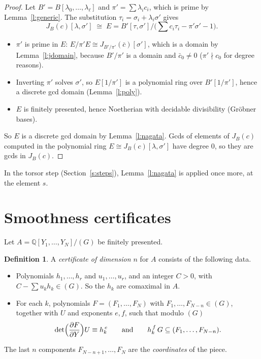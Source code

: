 \documentclass[11pt]{article}
\newcommand{\Q}{\mathbb{Q}}
\numberwithin{equation}{section}
\theoremstyle{plain}
\theoremstyle{definition}
\newtheorem{definition}[theorem]{Definition}
\theoremstyle{remark}
\begin{document}
\begin{proof}
Let $B'=B[\lambda_0,\dots,\lambda_\ell]$ and $\pi'=\sum\lambda_ic_i$, which is prime by
Lemma~\ref{l:generic}. The substitution $\tau_i=\sigma_i+\lambda_i\sigma'$ gives
\[
J_B(c)[\lambda,\sigma']\;\cong\;E=B'[\tau,\sigma']\Big/\Big(\sum c_i\tau_i-\pi'\sigma'-1\Big).
\]
\begin{itemize}
\item $\pi'$ is prime in $E$: $E/\pi'E\cong J_{B'/\pi'}(\bar c)[\sigma']$, which is a domain by
  Lemma~\ref{l:jdomain}, because $B'/\pi'$ is a domain and $\bar c_0\ne0$ ($\pi'\nmid c_0$ for
  degree reasons).
\item Inverting $\pi'$ solves $\sigma'$, so $E[1/\pi']$ is a polynomial ring over $B'[1/\pi']$, hence
  a discrete gcd domain (Lemma~\ref{l:poly}).
\item $E$ is finitely presented, hence Noetherian with decidable divisibility (Gröbner bases).
\end{itemize}
So $E$ is a discrete gcd domain by Lemma~\ref{l:nagata}. Gcds of elements of $J_B(c)$ computed in the
polynomial ring $E\cong J_B(c)[\lambda,\sigma']$ have degree $0$, so they are gcds in $J_B(c)$.
\end{proof}
In the torsor step (Section~\ref{s:steps}), Lemma~\ref{l:nagata} is applied once more, at the
element $s$.

\section{Smoothness certificates}\label{s:cert}

Let $A=\Q[Y_1,\dots,Y_N]/(G)$ be finitely presented.

\begin{definition}\label{d:cert}
A \emph{certificate of dimension $n$} for $A$ consists of the following data.
\begin{itemize}
\item Polynomials $h_1,\dots,h_r$ and $u_1,\dots,u_r$, and an integer $C>0$, with
  $C-\sum u_kh_k\in(G)$. So the $h_k$ are comaximal in $A$.
\item For each $k$, polynomials $F=(F_1,\dots,F_N)$ with $F_1,\dots,F_{N-n}\in(G)$, together with
  $U$ and exponents $e,f$, such that modulo $(G)$
  \[
  \det\Bigl(\frac{\partial F}{\partial Y}\Bigr)U\equiv h_k^{\,e}
  \qquad\text{and}\qquad
  h_k^{\,f}\,G\subseteq(F_1,\dots,F_{N-n}).
  \]
\end{itemize}
The last $n$ components $F_{N-n+1},\dots,F_N$ are the \emph{coordinates} of the piece.
\end{definition}
\end{document}
